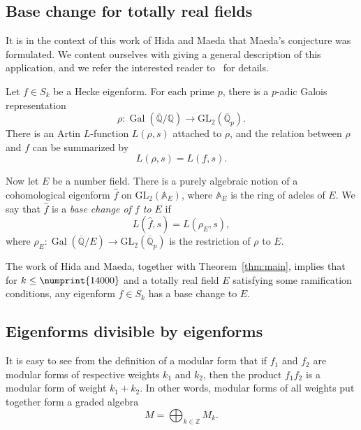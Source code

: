 \documentclass{book}
\newcommand{\longto}{\longrightarrow}
\newcommand{\ZZ}{\mathbb{Z}}
\newcommand{\QQ}{\mathbb{Q}}
\newcommand{\Gal}{\operatorname{Gal}}
\newcommand{\bound}{\numprint{14000}}
\newcommand{\GL}{\mathrm{GL}}
\begin{document}
\subsection{Base change for totally real fields}
It is in the context of this work of Hida and Maeda that
Maeda's conjecture was formulated.  We content ourselves with giving a general
description of this application, and we refer the interested reader
to~\cite{HidaMaeda} for details. 

Let $f\in S_k$ be a Hecke eigenform.  For each prime $p$, there is a $p$-adic
Galois representation
\begin{equation*}
  \rho\colon\Gal\left(\overline{\QQ}/\QQ\right)
  \longto\GL_2\left(\overline{\QQ}_p\right).
\end{equation*}
There is an Artin $L$-function $L(\rho, s)$ attached to $\rho$, and the
relation between $\rho$ and $f$ can be summarized by
\begin{equation*}
  L(\rho, s) = L(f, s).
\end{equation*}

Now let $E$ be a number field.  There is a purely algebraic notion of a
cohomological eigenform $\hat{f}$ on $\GL_2(\mathbb{A}_E)$, where 
$\mathbb{A}_E$ is the ring
of adeles of $E$.  We say that $\hat{f}$ is a \emph{base change of $f$ to $E$}
if
\begin{equation*}
  L(\hat{f}, s) = L(\rho_E, s),
\end{equation*}
where $\rho_E\colon\Gal(\overline{\QQ}/E)\longto\GL_2(\overline{\QQ}_p)$ is
the restriction of $\rho$ to $E$.

The work of Hida and Maeda, together with Theorem~\ref{thm:main}, implies that
for $k\leq\bound$ and a totally real field $E$ satisfying some ramification
conditions, any eigenform $f\in S_k$ has a base change to $E$.

\subsection{Eigenforms divisible by eigenforms}
It is easy to see from the definition of a modular form that if $f_1$ and
$f_2$ are modular forms of respective weights $k_1$ and $k_2$, then the
product $f_1f_2$ is a modular form of weight $k_1+k_2$.  In other words,
modular forms of all weights put together form a graded algebra
\begin{equation*}
  M=\bigoplus_{k\in\ZZ} M_k.
\end{equation*}
\end{document}
